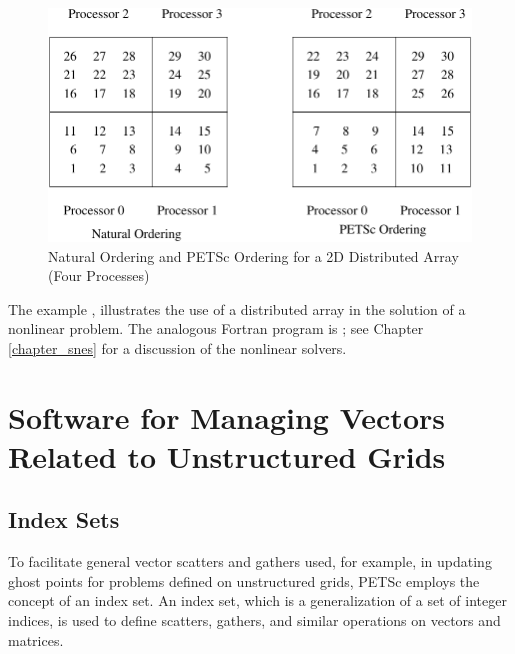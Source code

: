 \begin{figure}[tb]
\centerline{ \includegraphics{danumbering}}
\caption{Natural Ordering and PETSc Ordering for a 2D Distributed Array (Four Processes)}
\label{fig_daao}
\end{figure}

The example
,
illustrates the use of a distributed array in the solution of
a nonlinear problem.  The analogous Fortran program is
\break {};
see Chapter \ref{chapter_snes} for a discussion of the nonlinear
solvers.


\section{Software for Managing Vectors Related to Unstructured Grids}
\label{sec_unstruct}

\subsection{Index Sets} 
\label{sec_indexset}

To facilitate general vector scatters and gathers used, for example, in updating
ghost points for problems defined on unstructured grids, PETSc employs the
concept of an index set.  An index set, which is a generalization of a
set of integer indices, is used to define scatters, gathers, and similar
operations on vectors and matrices.

